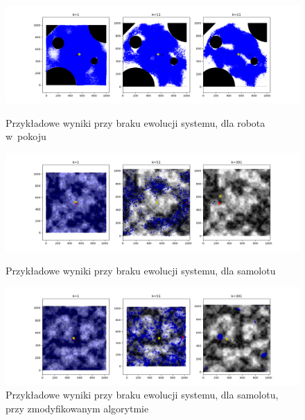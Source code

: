 \begin{figure}[H]
	\begin{center}
		\includegraphics[width=15cm]{./stationary.png}
		\caption{Przykładowe wyniki przy braku ewolucji systemu, dla robota w~pokoju}
		\label{stationary}
	\end{center}

\begin{center}
	\includegraphics[width=15cm]{./stationary_plane.png}
	\caption{Przykładowe wyniki przy braku ewolucji systemu, dla samolotu}
	\label{stationary_plane}
\end{center}

	\begin{center}
		\includegraphics[width=15cm]{./stationary_evol.png}
		\caption{Przykładowe wyniki przy braku ewolucji systemu, dla samolotu, przy zmodyfikowanym algorytmie}
		\label{stationary_evol}
	\end{center}
\end{figure}


